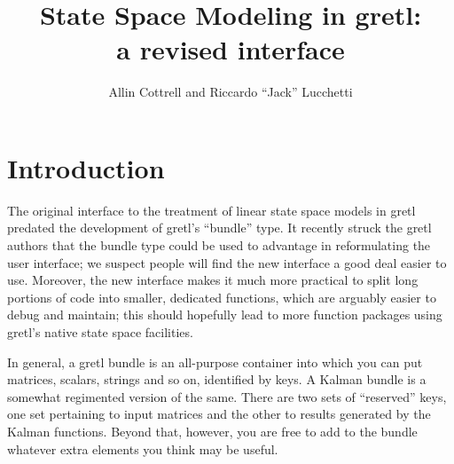 \documentclass[a4paper]{article}
\begin{document}
\newcommand{\obsvec}{\mathbf{y}}
\newcommand{\obsmat}{\mathbf{H}}
\newcommand{\obsx}{\mathbf{x}}
\newcommand{\obsxmat}{\mathbf{A}}
\newcommand{\obsdist}{\mathbf{w}}
\newcommand{\obsvar}{\mathbf{R}}

\newcommand{\statevec}{\bm{\xi}}
\newcommand{\statevar}{\mathbf{P}}
\newcommand{\statemat}{\mathbf{F}}
\newcommand{\strdist}{\mathbf{v}}
\newcommand{\strvar}{\mathbf{Q}}
\newcommand{\gain}{\mathbf{K}}
\newcommand{\statemu}{\bm{\mu}}

\newcommand{\altstrvar}{\mathbf{B}}
\newcommand{\altobsvar}{\mathbf{C}}
\newcommand{\alldist}{\bm{\varepsilon}}

\newcommand{\prederr}{\mathbf{e}}
\newcommand{\predvar}{\bm{\Sigma}}

\newcommand{\myvec}{\mbox{vec}}
\newcommand{\myvech}{\mbox{vech}}

\makeatletter
\def\pdots{\vbox{\baselineskip2.5\p@ 
  \lineskiplimit\z@ \kern2\p@\hbox{.}\hbox{.}\hbox{.}\hbox{.}}}
\makeatother

\setlength{\parindent}{0pt}
\setlength{\parskip}{1ex}

\title{State Space Modeling in gretl:\\a revised interface}
\author{Allin Cottrell and Riccardo ``Jack'' Lucchetti}
\maketitle

\section{Introduction}
\label{sec:amble}

The original interface to the treatment of linear state space models
in gretl predated the development of gretl's ``bundle'' type. It
recently struck the gretl authors that the bundle type could be used
to advantage in reformulating the user interface; we suspect people
will find the new interface a good deal easier to use. Moreover, the
new interface makes it much more practical to split long portions of
code into smaller, dedicated functions, which are arguably easier to
debug and maintain; this should hopefully lead to more function
packages using gretl's native state space facilities.

In general, a gretl bundle is an all-purpose container into which you
can put matrices, scalars, strings and so on, identified by keys. A
Kalman bundle is a somewhat regimented version of the same. There are
two sets of ``reserved'' keys, one set pertaining to input matrices
and the other to results generated by the Kalman functions.  Beyond
that, however, you are free to add to the bundle whatever extra
elements you think may be useful.
\end{document}
